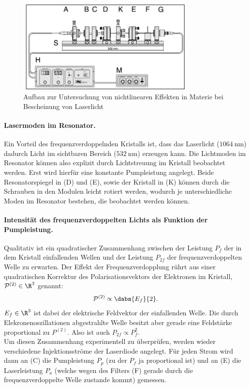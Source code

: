 \documentclass[../main.tex]{subfiles}
\begin{document}
        \begin{figure}[H]
            \centering
            \includegraphics[width=0.8\textwidth]{Bilddateien/Versuchsaufbau/Teil7.jpg}
            \caption{Aufbau zur Untersuchung von nichtlinearen Effekten in Materie bei Bescheinung von Laserlicht}
            \label{fig:AufbauTeil7}
        \end{figure}    

        
        \paragraph{Lasermoden im Resonator.}
            Ein Vorteil des frequenzverdoppelnden Kristalls ist, dass das Laserlicht ($\SI{1064}{\nano\m}$) dadurch Licht im sichtbaren Bereich ($\SI{532}{\nano\m}$) erzeugen kann. Die Lichtmoden im Resonator können also explizit durch Lichtstreuung im Kristall beobachtet werden. Erst wird hierfür eine konstante Pumpleistung angelegt. Beide Resonatorspiegel in (D) und (E), sowie der Kristall in (K) können durch die Schrauben in den Modulen leicht rotiert werden, wodurch je unterschiedliche Moden im Resonator bestehen, die beobachtet werden können.

        \paragraph{Intensität des frequenzverdoppelten Lichts als Funktion der Pumpleistung.}
            Qualitativ ist ein quadratischer Zusammenhang zwischen der Leistung $P_f$ der in dem Kristall einfallenden Wellen und der Leistung $P_{2f}$ der frequenzverdoppelten Welle zu erwarten. Der Effekt der Frequenzverdopplung rührt aus einer quadratischen Korrektur des Polarisationsvektors der Elektronen im Kristall, $\mathcal{P}^{(2)}\in\R^3$ genannt:
            \[
                \mathcal{P}^{(2)} \propto \dabs{E_f}{2}.
            \]
            $E_f\in\R^3$ ist dabei der elektrische Feldvektor der einfallenden Welle. Die durch Elekronenoszillationen abgestrahlte Welle besitzt aber gerade eine Feldstärke proportional zu $P^{(2)}$. Also ist auch $P_{2f}\propto P_{f}^2$.\\

            Um diesen Zusammenhang experimentell zu überprüfen, werden wieder verschiedene Injektionsströme der Laserdiode angelegt. Für jeden Strom wird dann an (C) die Pumpleistung $P_p$ (zu der $P_f$ ja proportional ist) und an (E) die Laserleistung $P_a$ (welche wegen des Filters (F) gerade durch die frequenzverdoppelte Welle zustande kommt) gemessen.
            
\end{document}
